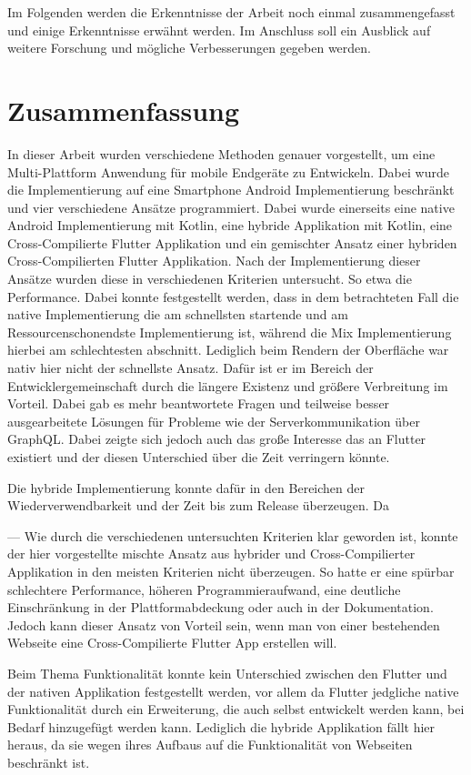 Im Folgenden werden die Erkenntnisse der Arbeit noch einmal zusammengefasst und einige Erkenntnisse erwähnt werden. Im Anschluss soll ein Ausblick auf weitere Forschung und mögliche Verbesserungen gegeben werden.

\section{Zusammenfassung}
In dieser Arbeit wurden verschiedene Methoden genauer vorgestellt, um eine Multi-Plattform Anwendung für mobile Endgeräte zu Entwickeln. Dabei wurde die Implementierung auf eine Smartphone Android Implementierung beschränkt und vier verschiedene Ansätze programmiert. Dabei wurde einerseits eine native Android Implementierung mit Kotlin, eine hybride Applikation mit Kotlin, eine Cross-Compilierte Flutter Applikation und ein gemischter Ansatz einer hybriden Cross-Compilierten Flutter Applikation. Nach der Implementierung dieser Ansätze wurden diese in verschiedenen Kriterien untersucht. So etwa die Performance. Dabei konnte festgestellt werden, dass in dem betrachteten Fall die native Implementierung die am schnellsten startende und am Ressourcenschonendste Implementierung ist, während die Mix Implementierung hierbei am schlechtesten abschnitt. Lediglich beim Rendern der Oberfläche war nativ hier nicht der schnellste Ansatz. Dafür ist er im Bereich der Entwicklergemeinschaft durch die längere Existenz und größere Verbreitung im Vorteil. Dabei gab es mehr beantwortete Fragen und teilweise besser ausgearbeitete Lösungen für Probleme wie der Serverkommunikation über GraphQL. Dabei zeigte sich jedoch auch das große Interesse das an Flutter existiert und der diesen Unterschied über die Zeit verringern könnte.

Die hybride Implementierung konnte dafür in den Bereichen der Wiederverwendbarkeit und der Zeit bis zum Release überzeugen. Da

---
Wie durch die verschiedenen untersuchten Kriterien klar geworden ist, konnte der hier vorgestellte mischte Ansatz aus hybrider und Cross-Compilierter Applikation in den meisten Kriterien nicht überzeugen. So hatte er eine spürbar schlechtere Performance, höheren Programmieraufwand, eine deutliche Einschränkung in der Plattformabdeckung oder auch in der Dokumentation. Jedoch kann dieser Ansatz von Vorteil sein, wenn man von einer bestehenden Webseite eine Cross-Compilierte Flutter App erstellen will.

Beim Thema Funktionalität konnte kein Unterschied zwischen den Flutter und der nativen Applikation festgestellt werden, vor allem da Flutter jedgliche native Funktionalität durch ein Erweiterung, die auch selbst entwickelt werden kann, bei Bedarf hinzugefügt werden kann. Lediglich die hybride Applikation fällt hier heraus, da sie wegen ihres Aufbaus auf die Funktionalität von Webseiten beschränkt ist.


